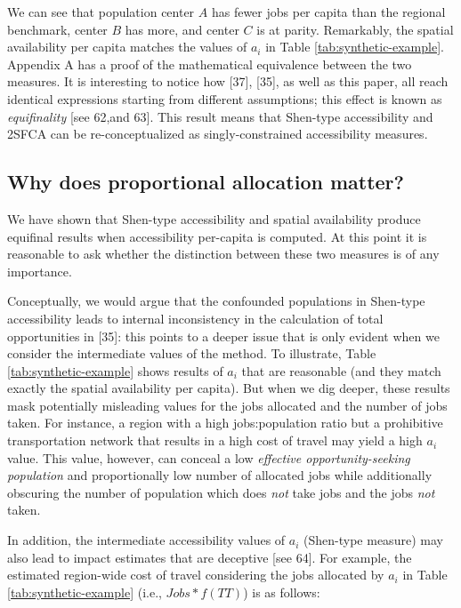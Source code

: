 \documentclass[10pt,letterpaper]{article}
\begin{document}
We can see that population center \(A\) has fewer jobs per capita than
the regional benchmark, center \(B\) has more, and center \(C\) is at
parity. Remarkably, the spatial availability per capita matches the
values of \(a_i\) in Table \ref{tab:synthetic-example}. Appendix A has a
proof of the mathematical equivalence between the two measures. It is
interesting to notice how {[}37{]}, {[}35{]}, as well as this paper, all
reach identical expressions starting from different assumptions; this
effect is known as \emph{equifinality} {[}see 62,and 63{]}. This result
means that Shen-type accessibility and 2SFCA can be re-conceptualized as
singly-constrained accessibility measures.

\hypertarget{why-does-proportional-allocation-matter}{%
\subsection{Why does proportional allocation
matter?}\label{why-does-proportional-allocation-matter}}

We have shown that Shen-type accessibility and spatial availability
produce equifinal results when accessibility per-capita is computed. At
this point it is reasonable to ask whether the distinction between these
two measures is of any importance.

Conceptually, we would argue that the confounded populations in
Shen-type accessibility leads to internal inconsistency in the
calculation of total opportunities in {[}35{]}: this points to a deeper
issue that is only evident when we consider the intermediate values of
the method. To illustrate, Table \ref{tab:synthetic-example} shows
results of \(a_i\) that are reasonable (and they match exactly the
spatial availability per capita). But when we dig deeper, these results
mask potentially misleading values for the jobs allocated and the number
of jobs taken. For instance, a region with a high jobs:population ratio
but a prohibitive transportation network that results in a high cost of
travel may yield a high \(a_i\) value. This value, however, can conceal
a low \emph{effective opportunity-seeking population} and proportionally
low number of allocated jobs while additionally obscuring the number of
population which does \emph{not} take jobs and the jobs \emph{not}
taken.

In addition, the intermediate accessibility values of \(a_i\) (Shen-type
measure) may also lead to impact estimates that are deceptive {[}see
64{]}. For example, the estimated region-wide cost of travel considering
the jobs allocated by \(a_i\) in Table \ref{tab:synthetic-example}
(i.e., \(Jobs*f(TT)\)) is as follows:
\end{document}

